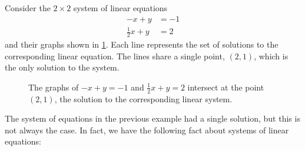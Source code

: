 \documentclass{article}
\begin{document}
\begin{example}\label{ex:linear-system-1}
    Consider the \(2 \times 2\) system of linear equations
    \begin{align*}
        -x+y&=-1 \\
        \frac{1}{2}x+y&=2
    \end{align*}
    and their graphs shown in \cref{fig:linear-system-1}. Each line represents the set of solutions to the corresponding linear equation. The lines share a single point, \((2, 1)\), which is the only solution to the system.

\begin{figure}[H]
    \centering
    \caption{The graphs of \(-x+y=-1\) and \(\frac{1}{2}x+y=2\) intersect at the point \((2, 1)\), the solution to the corresponding linear system.}
    \label{fig:linear-system-1}
\end{figure}
\end{example}

The system of equations in the previous example had a single solution, but this is not always the case. In fact, we have the following fact about systems of linear equations:
\end{document}
